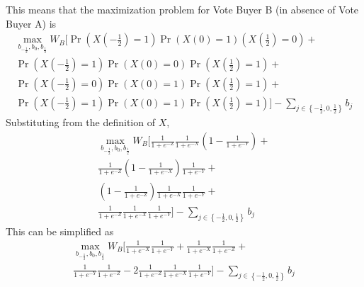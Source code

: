 \documentclass[12pt]{article}
\begin{document}
This means that the maximization problem for Vote Buyer B (in absence of Vote Buyer A) is
			  \begin{multline}
			    \max_{b_{-\frac{1}{2}}, b_0, b_{\frac{1}{2}}} 
					W_B \biggl[ \Pr\left(X\left(-\frac{1}{2}\right)=1\right)\Pr\left(X\left(0\right)=1\right)\left(X\left(\frac{1}{2}\right)=0\right)  + \\
					\Pr\left(X\left(-\frac{1}{2}\right)=1\right)\Pr\left(X\left(0\right)=0\right)\Pr\left(X\left(\frac{1}{2}\right)=1\right) + \\
					\Pr\left(X\left(-\frac{1}{2}\right)=0\right)\Pr\left(X\left(0\right)=1\right)\Pr\left(X\left(\frac{1}{2}\right)=1\right) + \\
					\Pr\left(X\left(-\frac{1}{2}\right)=1\right)\Pr\left(X\left(0\right)=1\right)\Pr\left(X\left(\frac{1}{2}\right)=1\right) \biggr] - \sum_{j\in \left\{-\frac{1}{2}, 0,\frac{1}{2}\right\}} b_j
				\end{multline}
			Substituting from the definition of $X$,
			  \begin{multline}
			    \max_{b_{-\frac{1}{2}}, b_0, b_{\frac{1}{2}}} 
					W_B \biggl[ \frac{1}{1+e^{-Z}} \frac{1}{1+e^{-X}} \left(1-\frac{1}{1+e^{-Y}}\right)  + \\
					\frac{1}{1+e^{-Z}} \left(1-\frac{1}{1+e^{-X}}\right) \frac{1}{1+e^{-Y}} + \\
					\left(1-\frac{1}{1+e^{-Z}} \right) \frac{1}{1+e^{-X}} \frac{1}{1+e^{-Y}} + \\
					\frac{1}{1+e^{-Z}} \frac{1}{1+e^{-X}} \frac{1}{1+e^{-Y}} \biggr] - \sum_{j\in \left\{-\frac{1}{2}, 0,\frac{1}{2}\right\}} b_j
				\end{multline}
			This can be simplified as 
			  \begin{multline}
			    \max_{b_{-\frac{1}{2}}, b_0, b_{\frac{1}{2}}} 
					W_B \biggl[ \frac{1}{1+e^{-X}} \frac{1}{1+e^{-Y}} +
					\frac{1}{1+e^{-X}} \frac{1}{1+e^{-Z}} + \\
					\frac{1}{1+e^{-Y}} \frac{1}{1+e^{-Z}} - 2	\frac{1}{1+e^{-Z}} \frac{1}{1+e^{-X}} \frac{1}{1+e^{-Y}} \biggr] - \sum_{j\in \left\{-\frac{1}{2}, 0,\frac{1}{2}\right\}} b_j
					\label{eq:objb}
				\end{multline}
		
\end{document}
